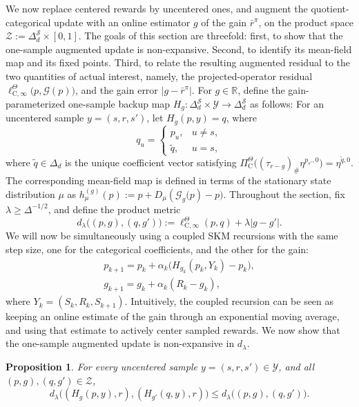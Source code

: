 \documentclass{article}
\newtheorem{proposition}[theorem]{Proposition}
\newcommand{\X}{\mathcal{S}}
\newcommand{\R}{\mathbb{R}}
\begin{document}
We now replace centered rewards by uncentered ones, and augment the quotient-categorical update with an online estimator $g$ of the gain $\bar r^\pi$, on the product space $\mathcal Z := \Delta^\X_d \times [0, 1]$. The goals of this section are threefold: first, to show that the one-sample augmented update is non-expansive. Second, to identify its mean-field map and its fixed points. Third, to relate the resulting augmented residual to the two quantities of actual interest, namely, the projected-operator residual $\ell^\Theta_{\mathrm C, \infty}\bigl(p, \mathcal G(p)\bigr)$, and the gain error $\lvert g - \bar r^\pi\rvert$. For $g \in \R$, define the gain-parameterized one-sample backup map $H_g:\Delta^\X_d \times \mathcal Y \to \Delta^\X_d$ as follows: For an uncentered sample $y=(s, r, s')$, let $H_g(p, y) = q$, where
\begin{equation}\label{eq:one-sample-backup-gain}
q_u = \begin{cases}
p_u, &u\ne s,\\
\tilde q, &u=s,
\end{cases}
\end{equation}
where $\tilde q \in \Delta_d$ is the unique coefficient vector satisfying $\Pi^\Theta_{\mathrm C}\bigl( (\tau_{r-g})_\# \eta ^{p_{s'}, 0}\bigr) = \eta^{\tilde q, 0}$. The corresponding mean-field map is defined in terms of the stationary state distribution $\mu$ as $h^{(g)}_\mu(p) := p + D_\mu(\mathcal G_g\bigl(p)-p\bigr)$. Throughout the section, fix $\lambda \ge \Delta^{-1/2}$, and define the product metric
\begin{equation}\label{eq:product-metric}
d_\lambda\bigl((p, g), (q, g')\bigr) := \ell^\Theta_{\mathrm C, \infty}(p, q) + \lambda \lvert g- g'\rvert.
\end{equation}
We will now be simultaneously using a coupled SKM recursions with the same step size, one for the categorical coefficients, and the other for the gain:
\begin{equation}\label{eq:coupled-skm}
\begin{gathered}
p_{k+1} = p_k + \alpha_k\bigl(H_{g_k}(p_k, Y_k) - p_k\bigr),\\
g_{k+1} = g_k + \alpha_k(R_k - g_k),
\end{gathered}
\end{equation}
where $Y_k = (S_k, R_k, S_{k+1})$. Intuitively, the coupled recursion can be seen as keeping an online estimate of the gain through an exponential moving average, and using that estimate to actively center sampled rewards. We now show that the one-sample augmented update is non-expansive in $d_\lambda$.
\begin{proposition}\label{prop:uncentered-nonexpansion}
For every uncentered sample $y = (s, r, s') \in \mathcal Y$, and all $(p, g), (q, g') \in \mathcal Z$,
\begin{equation}
d_\lambda\bigl( (H_g(p, y), r), (H_{g'}(q, y), r)\bigr) \le d_\lambda\bigl((p, g), (q, g')\bigr).
\end{equation}
\end{proposition}
\end{document}
